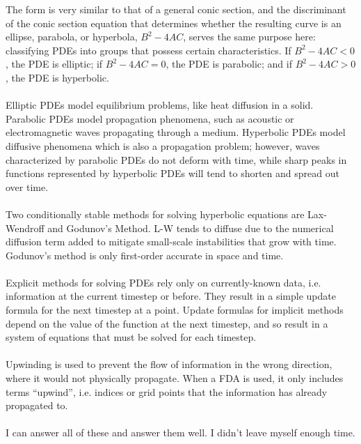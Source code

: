 \documentclass[12pt,letterpaper]{article}
\begin{document}
\begin{enumerate}
\begin{equation*}
\end{equation*}
The form is very similar to that of a general conic section, and the discriminant of the conic section equation that determines whether the resulting curve is an ellipse, parabola, or hyperbola, $B^2 - 4AC$, serves the same purpose here: classifying PDEs into groups that possess certain characteristics. If $B^2 - 4AC < 0$, the PDE is elliptic; if $B^2 - 4AC = 0$, the PDE is parabolic; and if $B^2 - 4AC > 0$, the PDE is hyperbolic.\\
\\
Elliptic PDEs model equilibrium problems, like heat diffusion in a solid. Parabolic PDEs model propagation phenomena, such as acoustic or electromagnetic waves propagating through a medium. Hyperbolic PDEs model diffusive phenomena which is also a propagation problem; however, waves characterized by parabolic PDEs do not deform with time, while sharp peaks in functions represented by hyperbolic PDEs will tend to shorten and spread out over time.\\
\\
Two conditionally stable methods for solving hyperbolic equations are Lax-Wendroff and Godunov's Method. L-W tends to diffuse due to the numerical diffusion term added to mitigate small-scale instabilities that grow with time. Godunov's method is only first-order accurate in space and time.\\
\\
Explicit methods for solving PDEs rely only on currently-known data, i.e. information at the current timestep or before. They result in a simple update formula for the next timestep at a point. Update formulas for implicit methods depend on the value of the function at the next timestep, and so result in a system of equations that must be solved for each timestep.\\
\\
Upwinding is used to prevent the flow of information in the wrong direction, where it would not physically propagate. When a FDA is used, it only includes terms ``upwind'', i.e. indices or grid points that the information has already propagated to.\\
\\
I can answer all of these and answer them well. I didn't leave myself enough time.


\end{enumerate}
\end{document}

